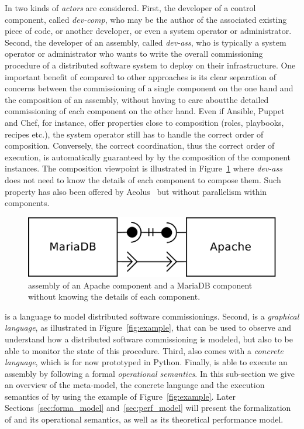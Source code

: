 In \mad two kinds of \emph{actors} are considered. First, the
developer of a control component, called \emph{dev-comp}, who may be
the author of the associated existing piece of code, or
another developer, or even a system operator or administrator. Second,
the developer of an assembly, called \emph{dev-ass}, who is typically
 a system operator or administrator
who wants to write the overall commissioning procedure of a
distributed software system to deploy on their infrastructure. One
important benefit of \mad compared to other approaches is its clear
separation of concerns between the commissioning of a single component
on the one hand and the composition of an assembly, without having to
care aboutthe detailed commissioning of each component on the other hand.
Even if Ansible, Puppet and
Chef, for instance, offer properties close to composition (\eg roles,
playbooks, recipes etc.), the system operator still has to handle the
correct order of composition. Conversely, the correct coordination,
thus the correct order of execution, is automatically guaranteed by
\mad by the composition of the component instances. The composition
viewpoint is illustrated in Figure~\ref{fig:simple} where
\emph{dev-ass} does not need to know the details of each component to
compose them. Such property has also been offered by Aeolus~\cite{}
but without parallelism within components.

\begin{figure}[tbp]
  \begin{center}
    \includegraphics[width=0.6\linewidth]{./images/simpleass.pdf}
  \end{center}
  \caption{\mad assembly of an Apache component and a MariaDB
    component without knowing the details of each component.}
  \label{fig:simple}
\end{figure}

\mad is a language to model distributed software commissionings.
Second, \mad is a
\emph{graphical language}, as illustrated in Figure~\ref{fig:example},
that can be used to observe and understand how a distributed software
commissioning is modeled, but also to be able to monitor the state of
this procedure. Third, \mad also comes with a \emph{concrete
  language}, which is for now prototyped in Python. Finally, \mad is
able to execute an assembly by following a formal \emph{operational
  semantics}. In this sub-section we give an overview of the
meta-model, the concrete language and the execution semantics of
\mad by using the example of Figure~\ref{fig:example}. Later
Sections~\ref{sec:forma_model} and~\ref{sec:perf_model} will present
the formalization of \mad and its operational semantics, as well as
its theoretical performance model.

